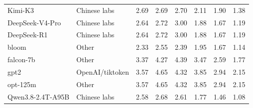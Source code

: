 \documentclass{standalone}
\begin{document}
\begin{tabular}{llrrrrrr}
Kimi-K3 & Chinese labs & 2.69 & 2.69 & 2.70 & 2.11 & 1.90 & 1.38 \\
DeepSeek-V4-Pro & Chinese labs & 2.64 & 2.72 & 3.00 & 1.88 & 1.67 & 1.19 \\
DeepSeek-R1 & Chinese labs & 2.64 & 2.72 & 3.00 & 1.88 & 1.67 & 1.19 \\
bloom & Other & 2.33 & 2.55 & 2.39 & 1.95 & 1.67 & 1.14 \\
falcon-7b & Other & 3.37 & 4.27 & 4.39 & 3.47 & 2.59 & 1.77 \\
gpt2 & OpenAI/tiktoken & 3.57 & 4.65 & 4.32 & 3.85 & 2.94 & 2.15 \\
opt-125m & Other & 3.57 & 4.65 & 4.32 & 3.85 & 2.94 & 2.15 \\
Qwen3.8-2.4T-A95B & Chinese labs & 2.58 & 2.68 & 2.61 & 1.77 & 1.46 & 1.08 \\
\bottomrule
\end{tabular}
\end{document}
